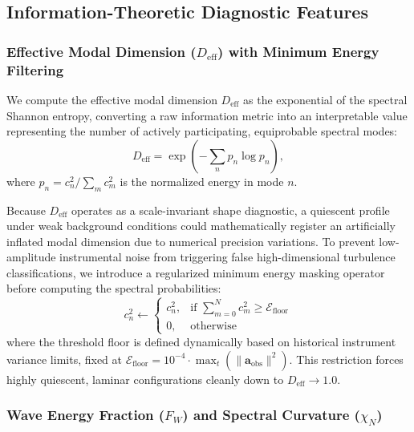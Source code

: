 \documentclass[11pt,a4paper]{article}
\begin{document}
\subsection{Information-Theoretic Diagnostic Features}
\label{sec:methods:diagnostics}

\subsubsection{Effective Modal Dimension ($D_{\mathrm{eff}}$) with Minimum Energy Filtering}

We compute the effective modal dimension $D_{\mathrm{eff}}$ as the exponential of the spectral Shannon entropy, converting a raw information metric into an interpretable value representing the number of actively participating, equiprobable spectral modes:
\begin{equation}
D_{\mathrm{eff}} = \exp\left( -\sum_n p_n \log p_n \right),
\label{eq:d_eff_def}
\end{equation}
where $p_n = c_n^2 / \sum_m c_m^2$ is the normalized energy in mode $n$.

Because $D_{\mathrm{eff}}$ operates as a scale-invariant shape diagnostic, a quiescent profile under weak background conditions could mathematically register an artificially inflated modal dimension due to numerical precision variations. To prevent low-amplitude instrumental noise from triggering false high-dimensional turbulence classifications, we introduce a regularized minimum energy masking operator before computing the spectral probabilities:
\begin{equation}
c_n^2 \leftarrow \begin{cases}
c_n^2, & \text{if } \sum_{m=0}^{N} c_m^2 \ge \mathcal{E}_{\text{floor}} \\
0, & \text{otherwise}
\end{cases}
\label{eq:energy_floor}
\end{equation}
where the threshold floor is defined dynamically based on historical instrument variance limits, fixed at $\mathcal{E}_{\text{floor}} = 10^{-4} \cdot \max_{t} \left(\|\mathbf{a}_{\mathrm{obs}}\|^2\right)$. This restriction forces highly quiescent, laminar configurations cleanly down to $D_{\mathrm{eff}} \to 1.0$.

\subsubsection{Wave Energy Fraction ($F_W$) and Spectral Curvature ($\chi_N$)}
\end{document}
